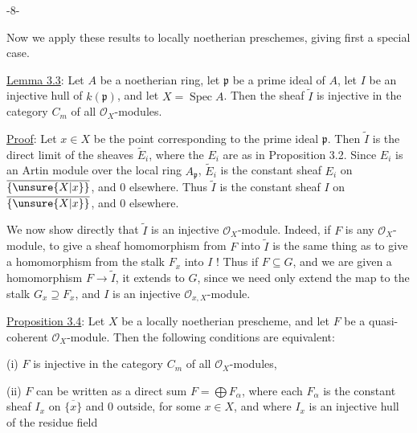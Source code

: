 \begin{center}-8-\end{center}

Now we apply these results to locally noetherian preschemes, giving first a special case.

\uline{Lemma 3.3}: Let $A$ be a noetherian ring, let $\mathfrak p$ be a prime ideal of $A$, let $I$ be an injective hull of $k(\mathfrak p)$, and let $X=\operatorname{Spec}A$. Then the sheaf $\widetilde I$ is injective in the category $C_m$ of all $\mathcal O_X$-modules.

\uline{Proof}: Let $x\in X$ be the point corresponding to the prime ideal $\mathfrak p$. Then $\widetilde I$ is the direct limit of the sheaves $\widetilde E_i$, where the $E_i$ are as in Proposition 3.2. Since $E_i$ is an Artin module over the local ring $A_{\mathfrak p}$, $\widetilde E_i$ is the constant sheaf $E_i$ on $\overline{\{\unsure{X|x}\}}$, and $0$ elsewhere. Thus $\widetilde I$ is the constant sheaf $I$ on $\overline{\{\unsure{X|x}\}}$, and $0$ elsewhere.

We now show directly that $\widetilde I$ is an injective $\mathcal O_X$-module. Indeed, if $F$ is any $\mathcal O_X$-module, to give a sheaf homomorphism from $F$ into $\widetilde I$ is the same thing as to give a homomorphism from the stalk $F_x$ into $I$ ! Thus if $F\subseteq G$, and we are given a homomorphism $F\longrightarrow\widetilde I$, it extends to $G$, since we need only extend the map to the stalk $G_x\supseteq F_x$, and $I$ is an injective $\mathcal O_{x,X}$-module.

\uline{Proposition 3.4}: Let $X$ be a locally noetherian prescheme, and let $F$ be a quasi-coherent $\mathcal O_X$-module. Then the following conditions are equivalent:

(i) $F$ is injective in the category $C_m$ of all $\mathcal O_X$-modules,

(ii) $F$ can be written as a direct sum $F=\bigoplus F_\alpha$, where each $F_\alpha$ is the constant sheaf $I_x$ on $\overline{\{x\}}$ and $0$ outside, for some $x\in X$, and where $I_x$ is an injective hull of the residue field
